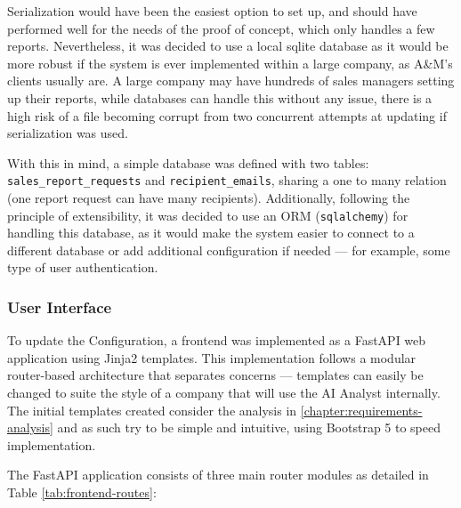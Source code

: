 \documentclass[a4paper]{report}
\begin{document}
Serialization would have been the easiest option to set up, and should have performed well for the needs of the proof of concept, which only handles a few reports. Nevertheless, it was decided to use a local sqlite database as it would be more robust if the system is ever implemented within a large company, as A\&M's clients usually are. A large company may have hundreds of sales managers setting up their reports, while databases can handle this without any issue, there is a high risk of a file becoming corrupt from two concurrent attempts at updating if serialization was used.

With this in mind, a simple database was defined with two tables: \texttt{sales\_report\_requests} and \texttt{recipient\_emails}, sharing a one to many relation (one report request can have many recipients). Additionally, following the principle of extensibility, it was decided to use an ORM (\texttt{sqlalchemy}) for handling this database, as it would make the system easier to connect to a different database or add additional configuration if needed --- for example, some type of user authentication.

\subsubsection{User Interface}

To update the Configuration, a frontend was implemented as a FastAPI web application using Jinja2 templates. This implementation follows a modular router-based architecture that separates concerns --- templates can easily be changed to suite the style of a company that will use the AI Analyst internally. The initial templates created consider the analysis in \autoref{chapter:requirements-analysis} and as such try to be simple and intuitive, using Bootstrap 5 to speed implementation.

The FastAPI application consists of three main router modules as detailed in Table \ref{tab:frontend-routes}:
\end{document}
